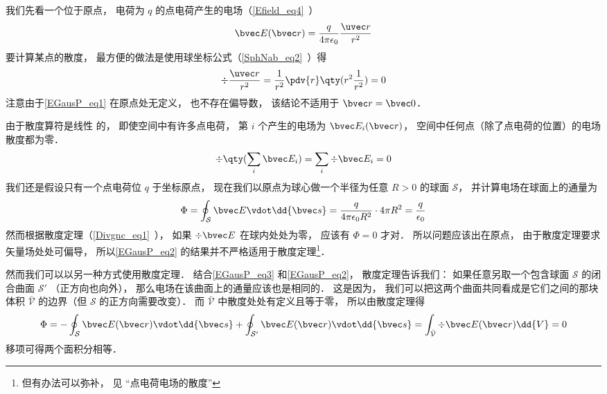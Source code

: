

我们先看一个位于原点， 电荷为 $q$ 的点电荷产生的电场（\autoref{Efield_eq4}~）
\begin{equation}\label{EGausP_eq1}
\bvec E(\bvec r) = \frac{q}{4\pi\epsilon_0}\frac{\uvec r}{r^2}
\end{equation}
要计算某点的散度， 最方便的做法是使用球坐标公式（\autoref{SphNab_eq2}~）得
\begin{equation}
\div \frac{\uvec r}{r^2} = \frac{1}{r^2} \pdv{r} \qty(r^2 \frac{1}{r^2}) = 0
\end{equation}
注意由于\autoref{EGausP_eq1} 在原点处无定义， 也不存在偏导数， 该结论不适用于 $\bvec r = \bvec 0$．

由于散度算符是线性%
的， 即使空间中有许多点电荷， 第 $i$ 个产生的电场为 $\bvec E_i(\bvec r)$， 空间中任何点（除了点电荷的位置）的电场散度都为零．
\begin{equation}\label{EGausP_eq3}
\div \qty(\sum_i \bvec E_i) = \sum_i \div \bvec E_i = 0
\end{equation}
我们还是假设只有一个点电荷位 $q$ 于坐标原点， 现在我们以原点为球心做一个半径为任意 $R > 0$ 的球面 $\mathcal S$， 并计算电场在球面上的通量为
\begin{equation}\label{EGausP_eq2}
\Phi = \oint_{\mathcal S} \bvec E \vdot \dd{\bvec s} = \frac{q}{4\pi\epsilon_0 R^2} \cdot 4\pi R^2 = \frac{q}{\epsilon_0}
\end{equation}
然而根据散度定理（\autoref{Divgnc_eq1}~）， 如果 $\div \bvec E$ 在球内处处为零， 应该有 $\Phi = 0$ 才对． 所以问题应该出在原点， 由于散度定理要求矢量场处处可偏导， 所以\autoref{EGausP_eq2} 的结果并不严格适用于散度定理\footnote{但有办法可以弥补， 见 “点电荷电场的散度”}． %

然而我们可以以另一种方式使用散度定理． 结合\autoref{EGausP_eq3} 和\autoref{EGausP_eq2}， 散度定理告诉我们： 如果任意另取一个包含球面 $\mathcal S$ 的闭合曲面 $\mathcal S'$ （正方向也向外）， 那么电场在该曲面上的通量应该也是相同的． 这是因为， 我们可以把这两个曲面共同看成是它们之间的那块体积 $\bar{\mathcal V}$ 的边界（但 $\mathcal S$ 的正方向需要改变）． 而 $\bar{\mathcal V}$ 中散度处处有定义且等于零， 所以由散度定理得
\begin{equation}
\Phi = -\oint_{\mathcal S} \bvec E(\bvec r) \vdot \dd{\bvec s} + \oint_{\mathcal S'} \bvec E(\bvec r)\vdot \dd{\bvec s} = \int_{\bar{\mathcal V}} \div \bvec E(\bvec r) \dd{V} = 0
\end{equation}
移项可得两个面积分相等．

